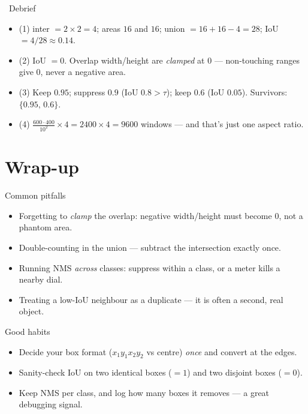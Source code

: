 \documentclass[10pt,aspectratio=169]{beamer}
\begin{document}
\begin{frame}{\faPen~Debrief}
  \begin{itemize}
    \item (1) inter $=2\times2=4$; areas $16$ and $16$; union $=16+16-4=28$; IoU $=4/28\approx0.14$.
    \item (2) IoU $=0$. Overlap width/height are \emph{clamped} at $0$ --- non-touching ranges give $0$, never a negative area.
    \item (3) Keep $0.95$; suppress $0.9$ (IoU $0.8>\tau$); keep $0.6$ (IoU $0.05$). Survivors: $\{0.95,\,0.6\}$.
    \item (4) $\tfrac{600\cdot400}{10^2}\times4 = 2400\times4 = 9600$ windows --- and that's just one aspect ratio.
  \end{itemize}
\end{frame}

\section{Wrap-up}

\begin{frame}{Common pitfalls}
  \begin{badbox}
    \begin{itemize}
      \item Forgetting to \emph{clamp} the overlap: negative width/height must become $0$, not a phantom area.
      \item Double-counting in the union --- subtract the intersection exactly once.
      \item Running NMS \emph{across} classes: suppress within a class, or a meter kills a nearby dial.
      \item Treating a low-IoU neighbour as a duplicate --- it is often a second, real object.
    \end{itemize}
  \end{badbox}
\end{frame}

\begin{frame}{Good habits}
  \begin{goodbox}
    \begin{itemize}
      \item Decide your box format ($x_1y_1x_2y_2$ vs centre) \emph{once} and convert at the edges.
      \item Sanity-check IoU on two identical boxes ($=1$) and two disjoint boxes ($=0$).
      \item Keep NMS per class, and log how many boxes it removes --- a great debugging signal.
    \end{itemize}
  \end{goodbox}
\end{frame}
\end{document}
